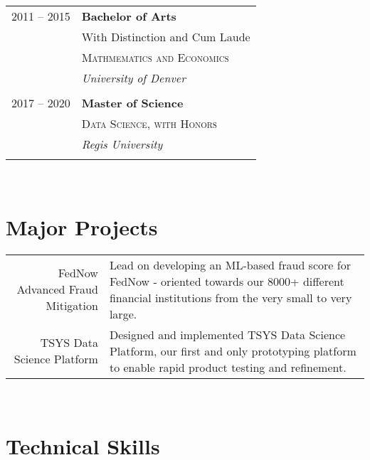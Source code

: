 \documentclass[10pt]{article} %
\begin{document}
\begin{minipage}[t]{0.44\textwidth}
\begin{tabular}{rl}
2011 -- 2015  & \textbf{Bachelor of Arts} \\ 
& \small{With Distinction and Cum Laude}\\
& \textsc{Mathmematics and Economics} \\ 
& \textit{University of Denver}\\
&\\
2017 -- 2020  & \textbf{Master of Science} \\ 
& \textsc{Data Science, with Honors} \\ 
& \textit{Regis University}\\
&\\	 


\end{tabular}\\[10pt]






\section{Major Projects}
\begin{tabular}{rl}
\parbox{0.35\textwidth}{FedNow Advanced Fraud Mitigation} & \parbox{0.5\textwidth}{Lead on developing an ML-based fraud score for FedNow - oriented towards our 8000+ different financial institutions from the very small to very large.}\\
\parbox{0.35\textwidth}{TSYS Data Science Platform} & \parbox{0.5\textwidth}{Designed and implemented TSYS Data Science Platform, our first and only prototyping platform to enable rapid product testing and refinement.  }\\
\end{tabular}\\[10pt]

\section{Technical Skills} 


\end{minipage}
\end{document}
